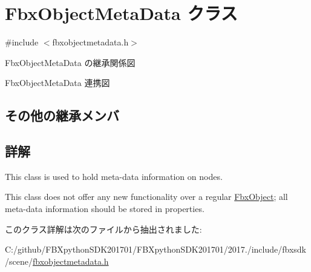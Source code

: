 \hypertarget{class_fbx_object_meta_data}{}\section{Fbx\+Object\+Meta\+Data クラス}
\label{class_fbx_object_meta_data}


{\ttfamily \#include $<$fbxobjectmetadata.\+h$>$}



Fbx\+Object\+Meta\+Data の継承関係図


Fbx\+Object\+Meta\+Data 連携図
\subsection*{その他の継承メンバ}


\subsection{詳解}
This class is used to hold meta-\/data information on nodes.

This class does not offer any new functionality over a regular \hyperlink{class_fbx_object}{Fbx\+Object}; all meta-\/data information should be stored in properties. 

このクラス詳解は次のファイルから抽出されました\+:\begin{DoxyCompactItemize}
\item 
C\+:/github/\+F\+B\+Xpython\+S\+D\+K201701/\+F\+B\+Xpython\+S\+D\+K201701/2017./include/fbxsdk/scene/\hyperlink{fbxobjectmetadata_8h}{fbxobjectmetadata.\+h}\end{DoxyCompactItemize}
